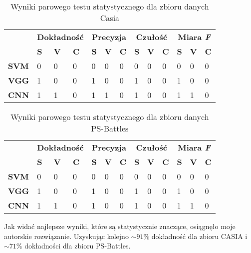 \begin{table}[h!]
	\centering
	\begin{tabular}{l|l|l|l|l|l|l|l|l|l|l|l|l|}
		\cline{2-13}
		&
		\multicolumn{3}{c|}{\textbf{Dokładność}} &
		\multicolumn{3}{c|}{\textbf{Precyzja}} &
		\multicolumn{3}{c|}{\textbf{Czułość}} &
		\multicolumn{3}{c|}{\textbf{Miara \textit{F}}} \\ \cline{2-13} 
		&
		\textbf{S} &
		\textbf{V} &
		\textbf{C} &
		\textbf{S} &
		\textbf{V} &
		\textbf{C} &
		\textbf{S} &
		\textbf{V} &
		\textbf{C} &
		\textbf{S} &
		\textbf{V} &
		\textbf{C} \\ \hline
		\multicolumn{1}{|l|}{\textbf{SVM}} & 0 & 0 & 0 & 0 & 0 & 0 & 0 & 0 & 0 & 0 & 0 & 0 \\ \hline
		\multicolumn{1}{|l|}{\textbf{VGG}} & 1 & 0 & 0 & 1 & 0 & 0 & 1 & 0 & 0 & 1 & 0 & 0 \\ \hline
		\multicolumn{1}{|l|}{\textbf{CNN}} & 1 & 1 & 0 & 1 & 1 & 0 & 1 & 0 & 0 & 1 & 1 & 0 \\ \hline
	\end{tabular}
	\caption{Wyniki parowego testu statystycznego dla zbioru danych Casia}
	\label{tab:t_results}
\end{table}

\begin{table}[h!]
	\centering
	\begin{tabular}{l|l|l|l|l|l|l|l|l|l|l|l|l|}
		\cline{2-13}
		&
		\multicolumn{3}{c|}{\textbf{Dokładność}} &
		\multicolumn{3}{c|}{\textbf{Precyzja}} &
		\multicolumn{3}{c|}{\textbf{Czułość}} &
		\multicolumn{3}{c|}{\textbf{Miara \textit{F}}} \\ \cline{2-13} 
		&
		\textbf{S} &
		\textbf{V} &
		\textbf{C} &
		\textbf{S} &
		\textbf{V} &
		\textbf{C} &
		\textbf{S} &
		\textbf{V} &
		\textbf{C} &
		\textbf{S} &
		\textbf{V} &
		\textbf{C} \\ \hline
		\multicolumn{1}{|l|}{\textbf{SVM}} & 0 & 0 & 0 & 0 & 0 & 0 & 0 & 0 & 0 & 0 & 0 & 0 \\ \hline
		\multicolumn{1}{|l|}{\textbf{VGG}} & 1 & 0 & 0 & 1 & 0 & 0 & 1 & 0 & 0 & 1 & 0 & 0 \\ \hline
		\multicolumn{1}{|l|}{\textbf{CNN}} & 1 & 1 & 0 & 1 & 0 & 0 & 1 & 0 & 0 & 1 & 1 & 0 \\ \hline
	\end{tabular}
	\caption{Wyniki parowego testu statystycznego dla zbioru danych PS-Battles}
	\label{tab:t_results_p}
\end{table}

Jak widać najlepsze wyniki, które są statystycznie znaczące, osiągnęło moje autorskie rozwiązanie. Uzyskując kolejno $\sim91\%$ dokładność dla zbioru CASIA i $\sim71\%$ dokładności dla zbioru PS-Battles.

